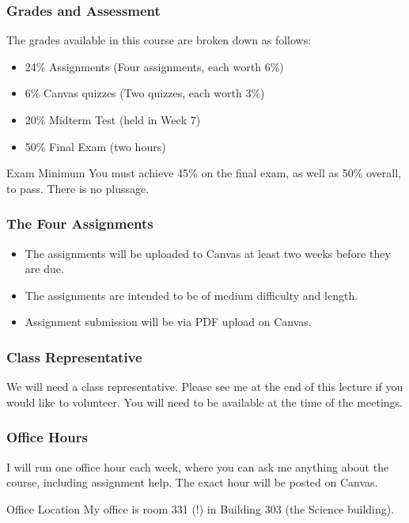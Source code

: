 \documentclass{beamer}
\begin{document}
\begin{frame}
\frametitle{Grades and Assessment}
The grades available in this course are broken down as follows:\pause

\begin{itemize}
\item 24\% Assignments (Four assignments, each worth 6\%)\pause
\item 6\% Canvas quizzes (Two quizzes, each worth 3\%)\pause
\item 20\% Midterm Test (held in Week 7)\pause
\item 50\% Final Exam (two hours)\pause
\end{itemize}

\begin{alertblock}{Exam Minimum}
You must achieve 45\% on the final exam, as well as 50\% overall, to pass.
There is no plussage.
\end{alertblock}
\end{frame}


\begin{frame}
\frametitle{The Four Assignments}
\begin{itemize}
\item The assignments will be uploaded to Canvas at least two weeks before they
are due.
\item The assignments are intended to be of medium difficulty and length.
\item Assignment submission will be via PDF upload on Canvas.
\end{itemize}

\end{frame}




\begin{frame}
\frametitle{Class Representative}
We will need a class representative. Please see me at the end of this lecture
if you would like to volunteer. You will need to be available at the time of the
meetings.


\end{frame}


\begin{frame}
\frametitle{Office Hours}
I will run one office hour each week, where you can ask me anything about the
course, including assignment help. The exact hour will be posted on Canvas. \pause

\begin{alertblock}{Office Location}
My office is room 331 (!) in Building 303 (the Science building).
\end{alertblock}
\end{frame}
\end{document}
